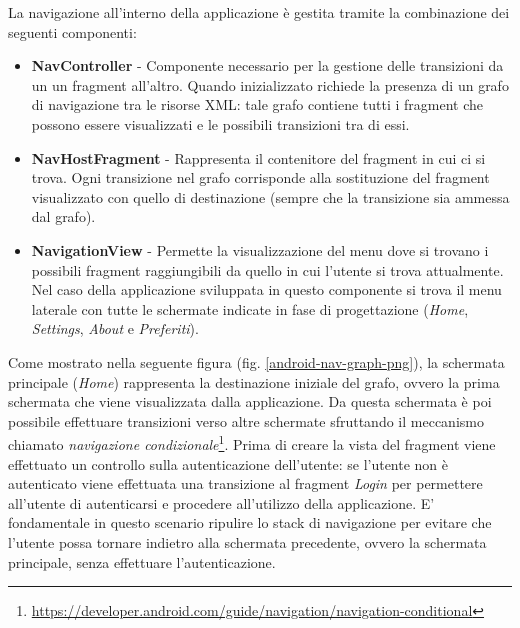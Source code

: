 La navigazione all'interno della applicazione è gestita tramite la combinazione dei seguenti componenti:

\begin{itemize}
    \item \textbf{NavController} - Componente necessario per la gestione delle transizioni da un un fragment all'altro. Quando inizializzato richiede la presenza di un grafo di navigazione tra le risorse XML: tale grafo contiene tutti i fragment che possono essere visualizzati e le possibili transizioni tra di essi.
    \item \textbf{NavHostFragment} - Rappresenta il contenitore del fragment in cui ci si trova. Ogni transizione nel grafo corrisponde alla sostituzione del fragment visualizzato con quello di destinazione (sempre che la transizione sia ammessa dal grafo).
    \item \textbf{NavigationView} - Permette la visualizzazione del menu dove si trovano i possibili fragment raggiungibili da quello in cui l'utente si trova attualmente. Nel caso della applicazione sviluppata in questo componente si trova il menu laterale con tutte le schermate indicate in fase di progettazione (\textit{Home}, \textit{Settings}, \textit{About} e \textit{Preferiti}).
\end{itemize}

Come mostrato nella seguente figura (fig. \ref{android-nav-graph-png}), la schermata principale (\textit{Home}) rappresenta la destinazione iniziale del grafo, ovvero la prima schermata che viene visualizzata dalla applicazione. Da questa schermata è poi possibile effettuare transizioni verso altre schermate sfruttando il meccanismo chiamato \textit{navigazione condizionale}\footnote{\href{https://developer.android.com/guide/navigation/navigation-conditional}{https://developer.android.com/guide/navigation/navigation-conditional}}. Prima di creare la vista del fragment viene effettuato un controllo sulla autenticazione dell'utente: se l'utente non è autenticato viene effettuata una transizione al fragment \textit{Login} per permettere all'utente di autenticarsi e procedere all'utilizzo della applicazione. E' fondamentale in questo scenario ripulire lo stack di navigazione per evitare che l'utente possa tornare indietro alla schermata precedente, ovvero la schermata principale, senza effettuare l'autenticazione.

